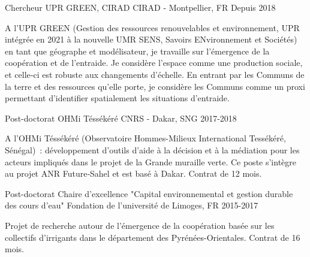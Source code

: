 

\begin{cventries}

  \cventry
    {Chercheur} %
    {UPR GREEN, CIRAD} %
    {CIRAD - Montpellier, FR} %
    {Depuis 2018} %
    {
      \begin{cvitems} %
        A l’UPR GREEN (Gestion des ressources renouvelables et environnement, UPR intégrée en 2021 à la nouvelle UMR SENS, Savoirs ENvironnement et Sociétés) en tant que géographe et modélisateur, je travaille sur l’émergence de la coopération et de l’entraide. Je considère l’espace comme une production sociale, et celle‑ci est robuste aux changements d’échelle. En entrant par les Communs de la terre et des ressources qu’elle porte, je considère les Communs comme un proxi permettant d’identifier spatialement les situations d’entraide.
      \end{cvitems}
    }


\cventry
  {Post-doctorat} %
  {OHMi Téssékéré} %
  {CNRS - Dakar, SNG} %
  {2017-2018} %
  {
    \begin{cvitems} %
      A l’OHMi Téssékéré (Observatoire Hommes-Milieux International Tessékéré, Sénégal) : développement d’outils d’aide à la décision et à la médiation pour les acteurs impliqués dans le projet de la Grande muraille verte. Ce poste s’intègre au projet ANR Future‑Sahel et est basé à Dakar. Contrat de 12 mois.
    \end{cvitems}
  }

\cventry
  {Post-doctorat} %
  {Chaire d'excellence "Capital environnemental et gestion durable des cours d'eau"} %
  {Fondation de l'université de Limoges, FR} %
  {2015-2017} %
  {
    \begin{cvitems} %
      Projet de recherche autour de l'émergence de la coopération basée sur les collectifs d'irrigants dans le département des Pyrénées-Orientales. Contrat de 16 mois.
    \end{cvitems}
  }


\end{cventries}
